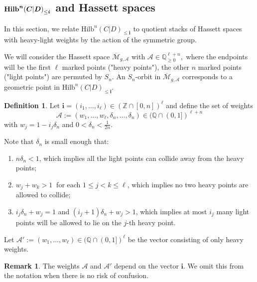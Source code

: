 \documentclass[10.5pt]{amsart}
\theoremstyle{definition}
\theoremstyle{definition}
\theoremstyle{definition}
\theoremstyle{definition}
\newtheorem{remark}[theorem]{Remark}
\newtheorem{definition}[theorem]{Definition}
\newcommand{\ol}[1]{\overline{#1}}
\newcommand{\Mcal}{\mathcal{M}}
\newcommand{\Mbar}{\ol{\Mcal}}
\newcommand{\Hilb}{\mathrm{Hilb}}
\newcommand{\cA}{\mathcal{A}}
\newcommand{\bi}{\boldsymbol{i}}
\begin{document}
\subsection{$\textbf{\text{Hilb}}^{\boldsymbol{n}}{(\boldsymbol{C}|\boldsymbol{D})}_{\leq \bi}$ and Hassett spaces}\label{subsec:Hilbquot}

In this section, we relate $\Hilb^n(C|D)_{\le \bi}$ to quotient stacks of Hassett spaces with heavy-light weights by the action of the symmetric group. 


We will consider the Hassett space $\Mbar_{g,\mathcal{A}}$ with $\mathcal{A} \in \mathbb{Q}_{\ge 0}^{\ell + n},$ where the endpoints will be the first $\ell$ marked points ("heavy points"), the other $n$ marked points ("light points") are permuted by $S_n.$ An $S_n$-orbit in $\Mbar_{g, \cA}$ corresponds to a geometric point in $\Hilb^n(C|D)_{\leq \bi}.$



\begin{definition}\label{defn:wtAbi}
    Let $\bi=(i_1,\dots,i_\ell) \in (\mathbb{Z}\cap [0,n])^\ell$ and define the set of weights \begin{equation} \label{hassettweights}\mathcal{A}:=\left(w_1, \dots ,w_\ell, \delta_n, \dots, \delta_n\right) \in (\mathbb{Q} \cap (0,1])^{\ell +n}\end{equation} with $w_j=1-i_j\delta_n$ and $0<\delta_n<\frac{1}{2n}.$ 
\end{definition}

Note that $\delta_n$ is small enough that: \begin{enumerate}
    \item $n\delta_n < 1$, which implies all the light points can collide away from the heavy points;
    \item $w_j + w_k>1 \ $ for each $  1\le j<k\le \ell$, which implies no two heavy points are allowed to collide;
    \item $i_j\delta_n+w_j=1$ and $(i_j+1)\delta_n + w_j>1$, which implies at most $i_j$ many light points will be allowed to lie on the $j$-th heavy point.
\end{enumerate}

 Let $\mathcal{A'}:=\left(w_1, \dots , w_\ell \right) \in (\mathbb{Q} \cap (0,1])^{\ell}$ be the vector consisting of only heavy weights. 

\begin{remark}
    The weights $\cA$ and $\cA'$ depend on the vector $\bi.$ We omit this from the notation when there is no risk of confusion.
\end{remark}
\end{document}

